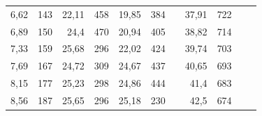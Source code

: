 \documentclass[a4paper,12pt]{article} %
\begin{document}
\begin{table}[]
\begin{tabular}{|rr|rr|rr|lrrll}
\multicolumn{1}{|r|}{6,62}          & 143                                  & \multicolumn{1}{r|}{22,11}         & 458                                  & \multicolumn{1}{r|}{19,85}         & 384                                  & \multicolumn{1}{l|}{} & \multicolumn{1}{r|}{37,91}         & \multicolumn{1}{r|}{722}             &                                    &                                      \\ \cline{1-6} \cline{8-9}
\multicolumn{1}{|r|}{6,89}          & 150                                  & \multicolumn{1}{r|}{24,4}          & 470                                  & \multicolumn{1}{r|}{20,94}         & 405                                  & \multicolumn{1}{l|}{} & \multicolumn{1}{r|}{38,82}         & \multicolumn{1}{r|}{714}             &                                    &                                      \\ \cline{1-6} \cline{8-9}
\multicolumn{1}{|r|}{7,33}          & 159                                  & \multicolumn{1}{r|}{25,68}         & 296                                  & \multicolumn{1}{r|}{22,02}         & 424                                  & \multicolumn{1}{l|}{} & \multicolumn{1}{r|}{39,74}         & \multicolumn{1}{r|}{703}             &                                    &                                      \\ \cline{1-6} \cline{8-9}
\multicolumn{1}{|r|}{7,69}          & 167                                  & \multicolumn{1}{r|}{24,72}         & 309                                  & \multicolumn{1}{r|}{24,67}         & 437                                  & \multicolumn{1}{l|}{} & \multicolumn{1}{r|}{40,65}         & \multicolumn{1}{r|}{693}             &                                    &                                      \\ \cline{1-6} \cline{8-9}
\multicolumn{1}{|r|}{8,15}          & 177                                  & \multicolumn{1}{r|}{25,23}         & 298                                  & \multicolumn{1}{r|}{24,86}         & 444                                  & \multicolumn{1}{l|}{} & \multicolumn{1}{r|}{41,4}          & \multicolumn{1}{r|}{683}             &                                    &                                      \\ \cline{1-6} \cline{8-9}
\multicolumn{1}{|r|}{8,56}          & 187                                  & \multicolumn{1}{r|}{25,65}         & 296                                  & \multicolumn{1}{r|}{25,18}         & 230                                  & \multicolumn{1}{l|}{} & \multicolumn{1}{r|}{42,5}          & \multicolumn{1}{r|}{674}             &                                    &                                      \\ \cline{1-6} \cline{8-9}

\end{tabular}
\end{table}
\end{document}

